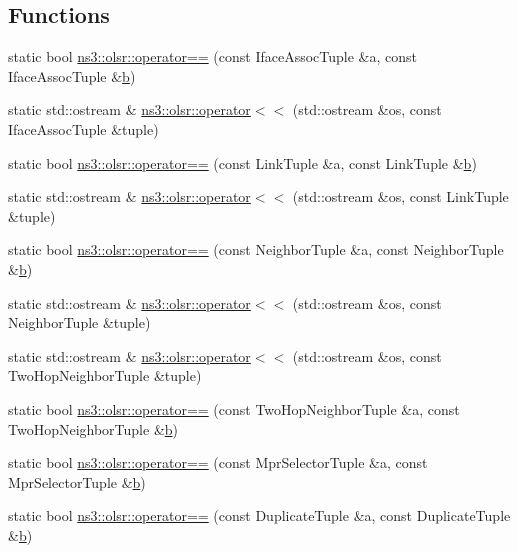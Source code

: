 \subsection*{Functions}
\begin{DoxyCompactItemize}
\item 
static bool \hyperlink{namespacens3_1_1olsr_a1bbb2f5032653940e75a0090956c7c7d}{ns3\+::olsr\+::operator==} (const Iface\+Assoc\+Tuple \&a, const Iface\+Assoc\+Tuple \&\hyperlink{lte__pathloss_8m_a21ad0bd836b90d08f4cf640b4c298e7c}{b})
\item 
static std\+::ostream \& \hyperlink{namespacens3_1_1olsr_a9fe8aa9ca65b2245c36856abe3b8a53c}{ns3\+::olsr\+::operator$<$$<$} (std\+::ostream \&os, const Iface\+Assoc\+Tuple \&tuple)
\item 
static bool \hyperlink{namespacens3_1_1olsr_abf9f5af36c1702b754ece97866f200fb}{ns3\+::olsr\+::operator==} (const Link\+Tuple \&a, const Link\+Tuple \&\hyperlink{lte__pathloss_8m_a21ad0bd836b90d08f4cf640b4c298e7c}{b})
\item 
static std\+::ostream \& \hyperlink{namespacens3_1_1olsr_a4d56e7c9cda66941b5696bf6d9036621}{ns3\+::olsr\+::operator$<$$<$} (std\+::ostream \&os, const Link\+Tuple \&tuple)
\item 
static bool \hyperlink{namespacens3_1_1olsr_ac6f94963744482d449b4acc4c87d0a58}{ns3\+::olsr\+::operator==} (const Neighbor\+Tuple \&a, const Neighbor\+Tuple \&\hyperlink{lte__pathloss_8m_a21ad0bd836b90d08f4cf640b4c298e7c}{b})
\item 
static std\+::ostream \& \hyperlink{namespacens3_1_1olsr_a9c3b1f93f73d25fe1fdc3f19553a0026}{ns3\+::olsr\+::operator$<$$<$} (std\+::ostream \&os, const Neighbor\+Tuple \&tuple)
\item 
static std\+::ostream \& \hyperlink{namespacens3_1_1olsr_ac745de55388f207ace0c62be3db18d88}{ns3\+::olsr\+::operator$<$$<$} (std\+::ostream \&os, const Two\+Hop\+Neighbor\+Tuple \&tuple)
\item 
static bool \hyperlink{namespacens3_1_1olsr_a27c065b59dabb85e4b3428c1ce9005d7}{ns3\+::olsr\+::operator==} (const Two\+Hop\+Neighbor\+Tuple \&a, const Two\+Hop\+Neighbor\+Tuple \&\hyperlink{lte__pathloss_8m_a21ad0bd836b90d08f4cf640b4c298e7c}{b})
\item 
static bool \hyperlink{namespacens3_1_1olsr_abb92e9c3a66270c623a7f77a46b3bc19}{ns3\+::olsr\+::operator==} (const Mpr\+Selector\+Tuple \&a, const Mpr\+Selector\+Tuple \&\hyperlink{lte__pathloss_8m_a21ad0bd836b90d08f4cf640b4c298e7c}{b})
\item 
static bool \hyperlink{namespacens3_1_1olsr_a338ddd99bfa3f17a76abdfd6fa9d1185}{ns3\+::olsr\+::operator==} (const Duplicate\+Tuple \&a, const Duplicate\+Tuple \&\hyperlink{lte__pathloss_8m_a21ad0bd836b90d08f4cf640b4c298e7c}{b})

\end{DoxyCompactItemize}
